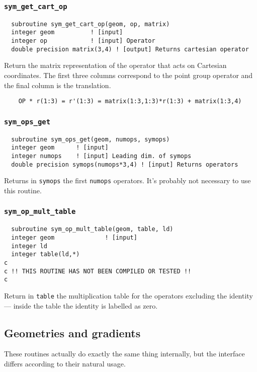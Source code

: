 \subsubsection{{\tt sym\_get\_cart\_op}}
\begin{verbatim}
  subroutine sym_get_cart_op(geom, op, matrix)
  integer geom          ! [input]
  integer op            ! [input] Operator
  double precision matrix(3,4) ! [output] Returns cartesian operator
\end{verbatim}
Return the matrix representation of the operator that acts on
Cartesian coordinates.  The first three columns correspond to the
point group operator and the final column is the translation.

\begin{verbatim}
    OP * r(1:3) = r'(1:3) = matrix(1:3,1:3)*r(1:3) + matrix(1:3,4)
\end{verbatim}

\subsubsection{{\tt sym\_ops\_get}}
\begin{verbatim}
  subroutine sym_ops_get(geom, numops, symops)
  integer geom      ! [input]
  integer numops    ! [input] Leading dim. of symops
  double precision symops(numops*3,4) ! [input] Returns operators
\end{verbatim}
Returns in \verb+symops+ the first \verb+numops+ operators.  It's 
probably not necessary to use this routine.

\subsubsection{{\tt sym\_op\_mult\_table}}
\begin{verbatim}
  subroutine sym_op_mult_table(geom, table, ld)
  integer geom              ! [input]
  integer ld
  integer table(ld,*)
c
c !! THIS ROUTINE HAS NOT BEEN COMPILED OR TESTED !!
c
\end{verbatim}
Return in \verb+table+ the multiplication table for the operators
excluding the identity --- inside the table the identity is labelled
as zero.

\subsection{Geometries and gradients}

These routines actually do exactly the same thing internally, but the
interface differs according to their natural usage.

